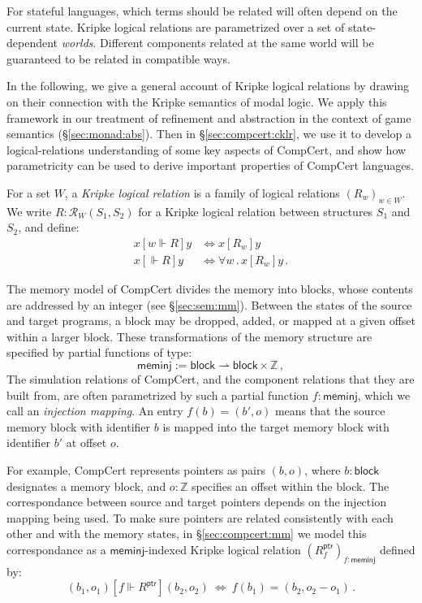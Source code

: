 \documentclass[sigplan,10pt,review,anonymous]{acmart}
\newcommand{\kw}[1]{\ensuremath{ \mathsf{#1} }}
\newcommand{\ifr}[1]{\mathrel{[{#1}]}}
\begin{document}
For stateful languages,
which terms should be related
will often depend on the current state.
Kripke logical relations
are parametrized over a set of state-dependent \emph{worlds}.
Different components related at the same world
will be guaranteed to be related in compatible ways.

In the following,
we give a general account of Kripke logical relations
by drawing on their connection with
the Kripke semantics of modal logic.
We apply this framework
in our treatment of refinement and abstraction
in the context of game semantics (\S\ref{sec:monad:abs}).
Then in \S\ref{sec:compcert:cklr},
we use it to develop a logical-relations
understanding of some key aspects of CompCert,
and show how parametricity
can be used to derive important properties
of CompCert languages.

\begin{definition}
For a set $W$,
a \emph{Kripke logical relation} is
a family of logical relations $(R_w)_{w \in W}$.
We write $R : \mathcal{R}_W(S_1, S_2)$
for a Kripke logical relation between structures $S_1$ and $S_2$,
and define:
\begin{align*}
  x \ifr{w \Vdash R} y &\Leftrightarrow x \ifr{R_w} y \\
  x \ifr{\Vdash R} y &\Leftrightarrow \forall w \,.\, x \ifr{R_w} y \,.
\end{align*}
\end{definition}

\begin{example} \label{ex:meminj} %
The memory model of CompCert divides the memory into blocks,
whose contents are addressed by an integer
(see \S\ref{sec:sem:mm}).
Between the states of the source and target programs,
a block may be dropped, added, or
mapped at a given offset within a larger block.
These transformations of the memory structure
are specified by partial functions of type:
\[
  \kw{meminj} := \kw{block} \rightharpoonup \kw{block} \times \mathbb{Z} \,,
\]
The simulation relations of CompCert,
and the component relations that they are built from,
are often parametrized by such a partial function $f : \kw{meminj}$,
which we call an \emph{injection mapping}.
An entry $f(b) = (b', o)$
means that the source memory block with identifier $b$
is mapped into the target memory block with identifier $b'$
at offset $o$.

For example,
CompCert represents pointers as pairs $(b, o)$, where
$b : \kw{block}$ designates a memory block, and
$o : \mathbb{Z}$ specifies an offset within the block.
The correspondance between source and target pointers
depends on the injection mapping being used.
To make sure pointers are related consistently
with each other and with the memory states,
in \S\ref{sec:compcert:mm}
we model this correspondance as a $\kw{meminj}$-indexed
Kripke logical relation $(R^\kw{ptr}_f)_{f : \kw{meminj}}$
defined by:
\[
    (b_1, o_1) \ifr{f \Vdash R^\kw{ptr}} (b_2, o_2) \:\Leftrightarrow\:
    f(b_1) = (b_2, o_2 - o_1) \,.
\]
\end{example}
\end{document}
